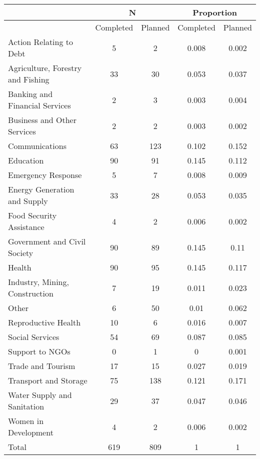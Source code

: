  \begin{tabular}{l cc cc}  & \multicolumn{2}{c}{N} & \multicolumn{2}{c}{Proportion} \\  \hline  & Completed & Planned & Completed & Planned \\ \hline Action Relating to Debt  &  5  &  2  &  0.008  &  0.002  \\ 
 Agriculture, Forestry and Fishing  &  33  &  30  &  0.053  &  0.037  \\ 
 Banking and Financial Services  &  2  &  3  &  0.003  &  0.004  \\ 
 Business and Other Services  &  2  &  2  &  0.003  &  0.002  \\ 
 Communications  &  63  &  123  &  0.102  &  0.152  \\ 
 Education  &  90  &  91  &  0.145  &  0.112  \\ 
 Emergency Response  &  5  &  7  &  0.008  &  0.009  \\ 
 Energy Generation and Supply  &  33  &  28  &  0.053  &  0.035  \\ 
 Food Security Assistance  &  4  &  2  &  0.006  &  0.002  \\ 
 Government and Civil Society  &  90  &  89  &  0.145  &  0.11  \\ 
 Health  &  90  &  95  &  0.145  &  0.117  \\ 
 Industry, Mining, Construction  &  7  &  19  &  0.011  &  0.023  \\ 
 Other  &  6  &  50  &  0.01  &  0.062  \\ 
 Reproductive Health  &  10  &  6  &  0.016  &  0.007  \\ 
 Social Services  &  54  &  69  &  0.087  &  0.085  \\ 
 Support to NGOs  &  0  &  1  &  0  &  0.001  \\ 
 Trade and Tourism  &  17  &  15  &  0.027  &  0.019  \\ 
 Transport and Storage  &  75  &  138  &  0.121  &  0.171  \\ 
 Water Supply and Sanitation  &  29  &  37  &  0.047  &  0.046  \\ 
 Women in Development  &  4  &  2  &  0.006  &  0.002  \\ 
  \hline Total &  619  &  809  &  1 & 1 \\ \hline  \end{tabular} 